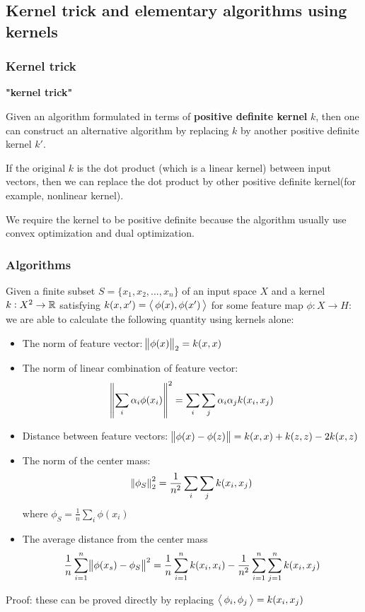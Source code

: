 \begin{refsection}
\subsection{Kernel trick and elementary algorithms using kernels}
\subsubsection{Kernel trick}
\begin{mdframed}
	\textbf{"kernel trick"}
	\cite[34]{scholkopf2002learning}
	
	Given an algorithm formulated in terms of \textbf{positive definite kernel }$k$, then one can construct an alternative algorithm by replacing $k$ by another positive definite kernel $k'$.
\end{mdframed}

\begin{remark}
	If the original $k$ is the dot product (which is a linear kernel) between input vectors, then we can replace the dot product by other positive definite kernel(for example, nonlinear kernel). 
\end{remark}

\begin{remark}
	We require the kernel to be positive definite because the algorithm usually use convex optimization and dual optimization.
\end{remark}

\subsubsection{Algorithms}
\begin{theorem}
	\cite[114]{shawe2004kernel}
	Given a finite subset $S=\{x_1,x_2,...,x_n\}$ of an input space $X$ and a kernel $k:X^2\to \mathbb{R}$ satisfying $k(x,x')={\left< \, \phi(x),\phi(x') \, \right>}$ for some feature map $\phi:X\to H$: we are able to calculate the following quantity using kernels alone:
	\begin{itemize}
		\item The norm of feature vector: $\norm{\phi(x)}_2 = k(x,x)$
		\item The norm of linear combination of feature vector: $$\norm{\sum_{i} \alpha_i \phi(x_i)}^2 = \sum_{i}\sum_j \alpha_i\alpha_j k(x_i,x_j)$$
		\item Distance between feature vectors: 
		$\norm{\phi(x) - \phi(z)} = k(x,x) + k(z,z) - 2k(x,z)$
		\item The norm of the center mass: 
		$$\norm{\phi_S}_2^2 = \frac{1}{n^2} \sum_i \sum_j k(x_i,x_j)$$
		where $\phi_S = \frac{1}{n}\sum_i \phi(x_i)$
		\item The average distance from the center mass 
		$$\frac{1}{n}\sum_{i=1}^n \norm{\phi(x_s) - \phi_S}^2 = \frac{1}{n}\sum_{i=1}^n k(x_i,x_i) - \frac{1}{n^2} \sum_{i=1}^n \sum_{j=1}^n k(x_i,x_j)$$
	\end{itemize}
\end{theorem}
Proof: these can be proved directly by replacing ${\left< \, \phi_i,\phi_j \, \right>} = k(x_i,x_j)$




\end{refsection}
